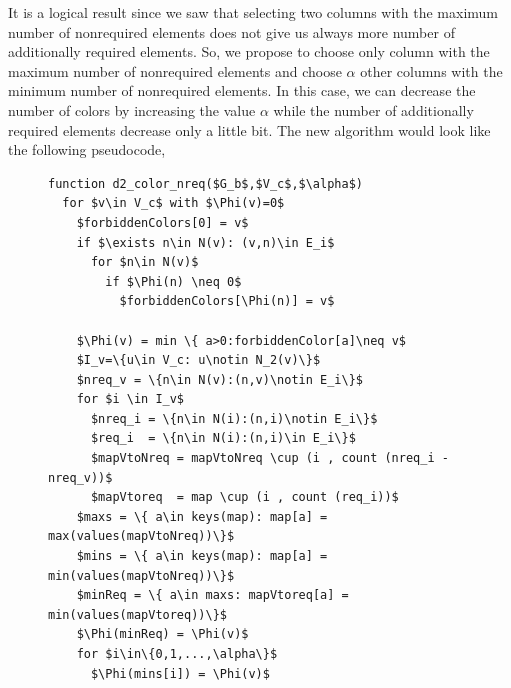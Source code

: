 \documentclass[12pt, oneside]{book}
\begin{document}
It is a logical result since we saw that selecting two columns with the maximum number of nonrequired
elements does not give us always more number of additionally required elements.
So, we propose to choose only column with the maximum number of nonrequired elements and
choose $\alpha$ other columns with the minimum number of nonrequired elements. In this case, 
we can decrease the number of colors by increasing the value $\alpha$ while the number of
additionally required elements decrease only a little bit.
The new algorithm would look like the following pseudocode,
\begin{figure}
\begin{lstlisting}[caption=New coloring heuristc with a controller to balance the number of colors and the number of additionally required elements.,label=code.new.impr2,mathescape]
function d2_color_nreq($G_b$,$V_c$,$\alpha$)
  for $v\in V_c$ with $\Phi(v)=0$
    $forbiddenColors[0] = v$
    if $\exists n\in N(v): (v,n)\in E_i$ 
      for $n\in N(v)$
        if $\Phi(n) \neq 0$
          $forbiddenColors[\Phi(n)] = v$

    $\Phi(v) = min \{ a>0:forbiddenColor[a]\neq v$
    $I_v=\{u\in V_c: u\notin N_2(v)\}$
    $nreq_v = \{n\in N(v):(n,v)\notin E_i\}$
    for $i \in I_v$
      $nreq_i = \{n\in N(i):(n,i)\notin E_i\}$
      $req_i  = \{n\in N(i):(n,i)\in E_i\}$ 
      $mapVtoNreq = mapVtoNreq \cup (i , count (nreq_i - nreq_v))$
      $mapVtoreq  = map \cup (i , count (req_i))$
    $maxs = \{ a\in keys(map): map[a] = max(values(mapVtoNreq))\}$
    $mins = \{ a\in keys(map): map[a] = min(values(mapVtoNreq))\}$
    $minReq = \{ a\in maxs: mapVtoreq[a] = min(values(mapVtoreq))\}$
    $\Phi(minReq) = \Phi(v)$
    for $i\in\{0,1,...,\alpha\}$
      $\Phi(mins[i]) = \Phi(v)$
\end{lstlisting}
\end{figure}
\end{document}
